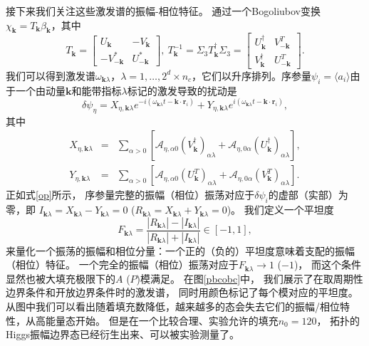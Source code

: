    接下来我们关注这些激发谱的振幅-相位特征。
   通过一个Bogoliubov变换$\chi_{\bm{k}} = T_{\bm{k}} \beta_{\bm{k}}$，其中
\begin{equation}
  T_{\bm{k}} = \left[\begin{array}{cc}
  U_{\bm{k}} & - V_{\bm{k}}\\
  - V_{-\bm{k}}^{\ast} & U_{-\bm{k}}^{\ast}
\end{array}\right],\ T_{\bm{k}}^{- 1} = \Sigma_3
T_{\bm{k}}^{\dag} \Sigma_3 = \left[\begin{array}{cc}
  U_{\bm{k}}^{\dag} & V_{-\bm{k}}^T\\
  V_{\bm{k}}^{\dag} & U_{-\bm{k}}^T
\end{array}\right].\nonumber
\end{equation}
我们可以得到激发谱$\omega_{\bm{k} \lambda}$，$\lambda = 1, \ldots, 2^d\times n_c$，它们以升序排列。序参量$\psi_i=\langle a_i \rangle$由于一个由动量$\bm{k}$和能带指标$\lambda$标记的激发导致的扰动是
\[ \delta \psi_\eta = X_{\eta, \bm{k}\lambda} e^{- i
   (\omega_{\bm{k}\lambda} t -\bm{k} \cdot \bm{r}_i)} + Y_{\eta,
   \bm{k}\lambda} e^{i (\omega_{\bm{k}\lambda} t -\bm{k} \cdot
   \bm{r}_i)}, \]
其中
\begin{eqnarray*}
  X_{\eta, \bm{k}\lambda} & = & \sum_{\alpha > 0} [\mathcal{A}_{\eta, \alpha
  0} (V_{\bm{k}}^{\dag})_{\alpha \lambda} +\mathcal{A}_{\eta, 0 \alpha}
  (U^{\dag}_{\bm{k}})_{\alpha \lambda}],\\
  Y_{\eta, \bm{k}\lambda} & = & \sum_{\alpha > 0} [\mathcal{A}_{\eta, \alpha
  0} (U^T_{\bm{k}})_{\alpha \lambda} +\mathcal{A}_{\eta, 0 \alpha}
  (V_{\bm{k}}^T)_{\alpha \lambda}] .
\end{eqnarray*}
正如式\eqref{op}所示，
序参量完整的振幅（相位）振荡对应于$\delta \psi_i$的虚部（实部）为零，即
$I_{\bm{k}\lambda} = X_{\bm{k}\lambda} - Y_{\bm{k}\lambda} = 0$ ($R_{\bm{k}\lambda} = X_{\bm{k}\lambda} + Y_{\bm{k}\lambda} = 0$)。
我们定义一个平坦度 \cite{Liberto2018}
\begin{equation}
  F_{\bm{k}\lambda} = \frac{| R_{\bm{k}\lambda} | - | I_{\bm{k}\lambda} |}{|
   R_{\bm{k}\lambda} | + | I_{\bm{k}\lambda} |} \in [- 1, 1],\label{flatness}
\end{equation}
来量化一个振荡的振幅和相位分量：一个正的（负的）平坦度意味着支配的振幅（相位）特征。
一个完全的振幅（相位）振荡对应于$F_{\bm{k}\lambda} \rightarrow 1$ ($- 1$)，
而这个条件显然也被大填充极限下的$A$ ($P$)模满足。
在图\ref{pbcobc}中，
我们展示了在取周期性边界条件和开放边界条件时的激发谱，
同时用颜色标记了每个模对应的平坦度。
从图中我们可以看出随着填充数降低，越来越多的态会失去它们的振幅/相位特性，从高能量态开始。
但是在一个比较合理、实验允许的填充$n_0=120$，
拓扑的Higgs振幅边界态已经衍生出来、可以被实验测量了。


